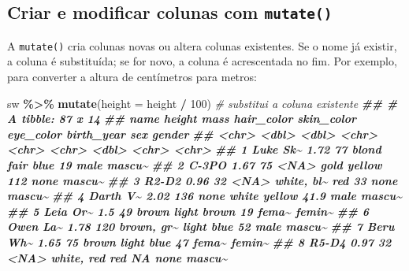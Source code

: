 \documentclass[
  portuguese,
  11pt,
  openany]{book}
\newenvironment{Shaded}{\begin{snugshade}}{\end{snugshade}}
\newcommand{\AttributeTok}[1]{\textcolor[rgb]{0.13,0.29,0.53}{#1}}
\newcommand{\CommentTok}[1]{\textcolor[rgb]{0.56,0.35,0.01}{\textit{#1}}}
\newcommand{\DecValTok}[1]{\textcolor[rgb]{0.00,0.00,0.81}{#1}}
\newcommand{\DocumentationTok}[1]{\textcolor[rgb]{0.56,0.35,0.01}{\textbf{\textit{#1}}}}
\newcommand{\FunctionTok}[1]{\textcolor[rgb]{0.13,0.29,0.53}{\textbf{#1}}}
\newcommand{\NormalTok}[1]{#1}
\newcommand{\SpecialCharTok}[1]{\textcolor[rgb]{0.81,0.36,0.00}{\textbf{#1}}}
\newcounter{none} %
\begin{document}
\subsection{\texorpdfstring{Criar e modificar colunas com \texttt{mutate()}}{Criar e modificar colunas com mutate()}}\label{criar-e-modificar-colunas-com-mutate}

A \texttt{mutate()} cria colunas novas ou altera colunas existentes. Se o nome já existir, a
coluna é substituída; se for novo, a coluna é acrescentada no fim. Por exemplo, para
converter a altura de centímetros para metros:

\begin{Shaded}
\begin{Highlighting}[]
\NormalTok{sw }\SpecialCharTok{\%\textgreater{}\%} \FunctionTok{mutate}\NormalTok{(}\AttributeTok{height =}\NormalTok{ height }\SpecialCharTok{/} \DecValTok{100}\NormalTok{)          }\CommentTok{\# substitui a coluna existente}
\DocumentationTok{\#\# \# A tibble: 87 x 14}
\DocumentationTok{\#\#    name     height  mass hair\_color skin\_color eye\_color birth\_year sex   gender}
\DocumentationTok{\#\#    \textless{}chr\textgreater{}     \textless{}dbl\textgreater{} \textless{}dbl\textgreater{} \textless{}chr\textgreater{}      \textless{}chr\textgreater{}      \textless{}chr\textgreater{}          \textless{}dbl\textgreater{} \textless{}chr\textgreater{} \textless{}chr\textgreater{} }
\DocumentationTok{\#\#  1 Luke Sk\textasciitilde{}   1.72    77 blond      fair       blue            19   male  mascu\textasciitilde{}}
\DocumentationTok{\#\#  2 C{-}3PO      1.67    75 \textless{}NA\textgreater{}       gold       yellow         112   none  mascu\textasciitilde{}}
\DocumentationTok{\#\#  3 R2{-}D2      0.96    32 \textless{}NA\textgreater{}       white, bl\textasciitilde{} red             33   none  mascu\textasciitilde{}}
\DocumentationTok{\#\#  4 Darth V\textasciitilde{}   2.02   136 none       white      yellow          41.9 male  mascu\textasciitilde{}}
\DocumentationTok{\#\#  5 Leia Or\textasciitilde{}   1.5     49 brown      light      brown           19   fema\textasciitilde{} femin\textasciitilde{}}
\DocumentationTok{\#\#  6 Owen La\textasciitilde{}   1.78   120 brown, gr\textasciitilde{} light      blue            52   male  mascu\textasciitilde{}}
\DocumentationTok{\#\#  7 Beru Wh\textasciitilde{}   1.65    75 brown      light      blue            47   fema\textasciitilde{} femin\textasciitilde{}}
\DocumentationTok{\#\#  8 R5{-}D4      0.97    32 \textless{}NA\textgreater{}       white, red red             NA   none  mascu\textasciitilde{}}

\end{Highlighting}
\end{Shaded}
\end{document}
